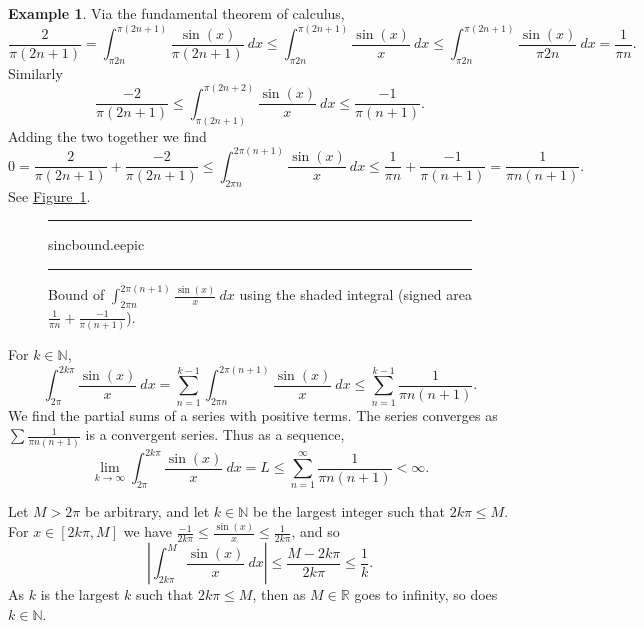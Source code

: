 \documentclass[12pt]{book}
\newenvironment{myfigureht}{%
\begin{figure}[h!t]
\noindent\rule{\textwidth}{0.4pt}\vspace{12pt}\par\centering}%
{\par\noindent\rule{\textwidth}{0.4pt}
\end{figure}}
\newcommand{\abs}[1]{\left\lvert {#1} \right\rvert}
\newcommand{\R}{{\mathbb{R}}}
\newcommand{\N}{{\mathbb{N}}}
\theoremstyle{plain}
\theoremstyle{remark}
\theoremstyle{definition}
\theoremstyle{exercise}
\theoremstyle{example}
\newtheorem{example}[thm]{Example}
\newcommand{\figureref}[1]{\hyperref[#1]{Figure~\ref*{#1}}}
\begin{document}
\begin{example}
Via the fundamental theorem of calculus,
\begin{equation*}
\frac{2}{\pi (2n+1)}
=
\int_{\pi 2n}^{\pi (2n+1)}
\frac{\sin(x)}{\pi (2n+1)}
~dx
\leq
\int_{\pi 2n}^{\pi (2n+1)}
\frac{\sin(x)}{x}
~dx
\leq
\int_{\pi 2n}^{\pi (2n+1)}
\frac{\sin(x)}{\pi 2n}
~dx
=
\frac{1}{\pi n} .
\end{equation*}
Similarly
\begin{equation*}
\frac{-2}{\pi (2n+1)}
\leq
\int_{\pi (2n+1)}^{\pi (2n+2)}
\frac{\sin(x)}{x}
~dx
\leq
\frac{-1}{\pi (n+1)} .
\end{equation*}
Adding the two together we find
\begin{equation*}
0
=
\frac{2}{\pi (2n+1)}
+
\frac{-2}{\pi (2n+1)}
\leq
\int_{2\pi n}^{2\pi (n+1)}
\frac{\sin(x)}{x}
~dx
\leq
\frac{1}{\pi n} 
+
\frac{-1}{\pi (n+1)} 
=
\frac{1}{\pi n(n+1)} .
\end{equation*}
See \figureref{fig:sincbound}.
\begin{myfigureht}
{sincbound.eepic}
\caption{Bound of $\int_{2\pi n}^{2\pi (n+1)} \frac{\sin(x)}{x} ~dx$ using
the shaded integral (signed area
$\frac{1}{\pi n} 
+
\frac{-1}{\pi (n+1)}$).\label{fig:sincbound}}
\end{myfigureht}

For $k \in \N$, 
\begin{equation*}
\int_{2\pi}^{2k\pi} \frac{\sin(x)}{x} ~dx
=
\sum_{n=1}^{k-1}
\int_{2\pi n}^{2\pi (n+1)} \frac{\sin(x)}{x} ~dx 
\leq
\sum_{n=1}^{k-1}
\frac{1}{\pi n(n+1)} .
\end{equation*}
We find the partial sums of a series with positive terms.
The series
converges as
$\sum \frac{1}{\pi n (n+1)}$ is a convergent series.  Thus
as a sequence,
\begin{equation*}
\lim_{k\to \infty} \int_{2\pi}^{2k\pi} \frac{\sin(x)}{x} ~dx
=L \leq
\sum_{n=1}^{\infty}
\frac{1}{\pi n(n+1)} < \infty .
\end{equation*}

Let $M > 2\pi$ be arbitrary, and let $k \in \N$
be the largest integer such that $2k\pi \leq M$.
For $x \in [2k\pi,M]$ we have 
$\frac{-1}{2k\pi} \leq \frac{\sin(x)}{x} \leq \frac{1}{2k\pi}$, and so
\begin{equation*}
\abs{\int_{2k\pi}^{M} \frac{\sin(x)}{x} ~dx }  \leq
\frac{M-2k\pi}{2k\pi} \leq \frac{1}{k} .
\end{equation*}
As $k$ is the largest $k$ such that $2k\pi \leq M$,
then as $M\in \R$ goes to infinity, so does $k \in \N$.


\end{example}
\end{document}
